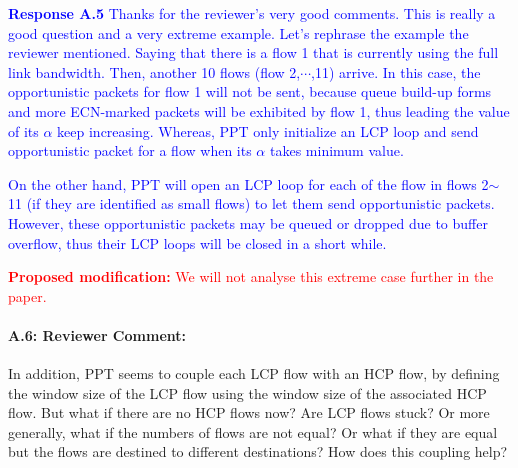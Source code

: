 \documentclass[12pt,one-column]{article}
\begin{document}
\noindent\textcolor{blue}{\textbf{Response A.5}
Thanks for the reviewer's very good comments.
This is really a good question and a very extreme example.
Let's rephrase the example the reviewer mentioned. Saying that there is a flow 1 that is currently using the full link bandwidth. Then, another 10 flows (flow 2,$\cdots$,11) arrive.
In this case, the opportunistic packets for flow 1 will not be sent, because queue build-up forms and more ECN-marked packets will be exhibited by flow 1, thus leading the value of its $\alpha$ keep increasing. Whereas, PPT only initialize an LCP loop and send opportunistic packet for a flow when its $\alpha$ takes minimum value.}

\textcolor{blue}{
On the other hand, PPT will open an LCP loop for each of the flow in flows 2$\sim$11 (if they are identified as small flows) to let them send opportunistic packets. However, these opportunistic packets may be queued or dropped due to buffer overflow, thus their LCP loops will be closed in a short while.
} 

\noindent\textcolor{red}{\textbf{Proposed modification: }
We will not analyse this extreme case further in the paper.
}

%


{\it \paragraph{A.6: Reviewer Comment:} In addition, PPT seems to couple each LCP flow with an HCP flow, by defining the window size of the LCP flow using the window size of the associated HCP flow. But what if there are no HCP flows now? Are LCP flows stuck? Or more generally, what if the numbers of flows are not equal? Or what if they are equal but the flows are destined to different destinations? How does this coupling help? }	
\end{document}
